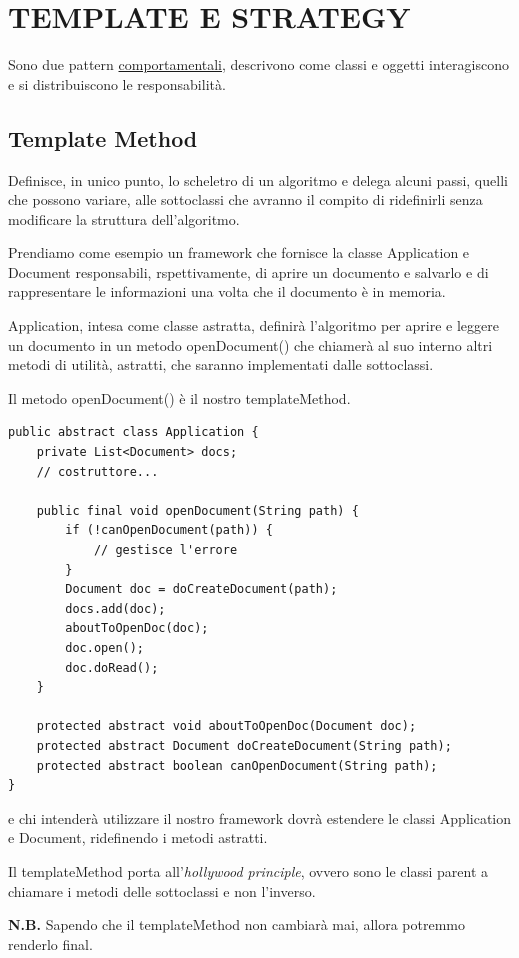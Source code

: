 \chapter{TEMPLATE E STRATEGY}
Sono due pattern \underline{comportamentali}, descrivono come classi e oggetti interagiscono e si distribuiscono le responsabilità.

\section{Template Method}
Definisce, in unico punto, lo scheletro di un algoritmo e delega alcuni passi, quelli che possono variare, alle sottoclassi che avranno il compito di ridefinirli senza
modificare la struttura dell'algoritmo.

Prendiamo come esempio un framework che fornisce la classe Application e Document responsabili, rspettivamente, di aprire un documento e salvarlo e di rappresentare 
le informazioni una volta che il documento è in memoria.

Application, intesa come classe astratta, definirà l’algoritmo per aprire e leggere un documento in un metodo openDocument() che chiamerà al suo interno altri metodi 
di utilità, astratti, che saranno implementati dalle sottoclassi.

Il metodo openDocument() è il nostro templateMethod.
\begin{lstlisting}
public abstract class Application {
    private List<Document> docs;
    // costruttore...
    
    public final void openDocument(String path) {
        if (!canOpenDocument(path)) {
            // gestisce l'errore
        }
        Document doc = doCreateDocument(path);
        docs.add(doc);
        aboutToOpenDoc(doc);
        doc.open();
        doc.doRead();
    }

    protected abstract void aboutToOpenDoc(Document doc);
    protected abstract Document doCreateDocument(String path);
    protected abstract boolean canOpenDocument(String path);
}
\end{lstlisting}

e chi intenderà utilizzare il nostro framework dovrà estendere le classi Application e Document, ridefinendo i metodi astratti.

Il templateMethod porta all'\textit{hollywood principle}, ovvero sono le classi parent a chiamare i metodi delle sottoclassi e non l'inverso. 

\medskip
\textbf{N.B.} Sapendo che il templateMethod non cambiarà mai, allora potremmo renderlo final.

